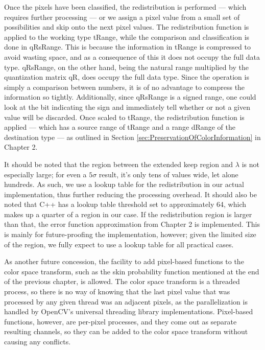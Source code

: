 Once the pixels have been classified, the redistribution is performed --- which requires further processing --- or we assign a pixel value from a small set of possibilities and skip onto the next pixel values. The redistribution function is applied to the working type tRange, while the comparison and classification is done in qRsRange. This is because the information in tRange is compressed to avoid wasting space, and as a consequence of this it does not occupy the full data type. qRsRange, on the other hand, being the natural range multiplied by the quantization matrix qR, does occupy the full data type. Since the operation is simply a comparison between numbers, it is of no advantage to compress the information so tightly. Additionally, since qRsRange is a signed range, one could look at the bit indicating the sign and immediately tell whether or not a given value will be discarded. Once scaled to tRange, the redistribution function is applied --- which has a source range of tRange and a range dRange of the destination type --- as outlined in Section \ref{sec:PreservationOfColorInformation} in Chapter 2.

It should be noted that the region between the extended keep region and $\lambda$ is not especially large; for even a $5\sigma$ result, it's only tens of values wide, let alone hundreds. As such, we use a lookup table for the redistribution in our actual implementation, thus further reducing the processing overhead. It should also be noted that C++ has a lookup table threshold set to approximately 64, which makes up a quarter of a region in our case. If the redistribution region is larger than that, the error function approximation from Chapter 2 is implemented. This is mainly for future-proofing the implementation, however; given the limited size of the region, we fully expect to use a lookup table for all practical cases.

As another future concession, the facility to add pixel-based functions to the color space transform, such as the skin probability function mentioned at the end of the previous chapter, is allowed. The color space transform is a threaded process, so there is no way of knowing that the last pixel value that was processed by any given thread was an adjacent pixels, as the parallelization is handled by OpenCV's universal threading library implementations. Pixel-based functions, however, are per-pixel processes, and they come out as separate resulting channels, so they can be added to the color space transform without causing any conflicts.



